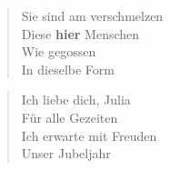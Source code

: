 \documentclass[twocolumn]{article}
\begin{document}
	\begin{verse}	
		Sie sind am verschmelzen \\
		Diese \textbf{hier} Menschen \\
		Wie gegossen \\
		In dieselbe Form \\
	\end{verse}
	
	\begin{verse}	
		Ich liebe dich, Julia \\
		Für alle Gezeiten \\
		Ich erwarte mit Freuden \\
		Unser Jubeljahr \\
	\end{verse}
\end{document}
